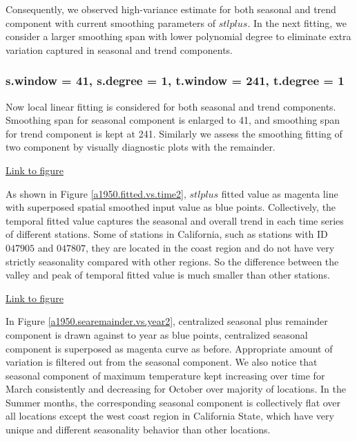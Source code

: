 Consequently, we observed high-variance estimate for both seasonal and trend
component with current smoothing parameters of $stlplus$. In the next fitting, we
consider a larger smoothing span with lower polynomial degree to eliminate extra
variation captured in seasonal and trend components. 

\subsubsection{s.window = 41, s.degree = 1, t.window = 241, t.degree = 1}

Now local linear fitting is considered for both seasonal and trend components. 
Smoothing span for seasonal component is enlarged to 41, and smoothing span for 
trend component is kept at 241. Similarly we assess the smoothing fitting of two
component by visually diagnostic plots with the remainder.

\begin{framed}
\begin{center}
  \href{../plots/a1950/stlplus/t241td1_s41sd1_ffd/a1950.stlraw.vs.time.pdf}
  {Link to figure}
  \label{a1950.fitted.vs.time2}
\end{center}
\end{framed}

As shown in Figure
\href{../plots/a1950/stlplus/t241td1_s41sd1_ffd/a1950.stlraw.vs.time.pdf}
{\ref*{a1950.fitted.vs.time2}}, $stlplus$ fitted value as magenta line with 
superposed spatial smoothed input value as blue points. Collectively, the temporal
fitted value captures the seasonal and overall trend in each time series of 
different stations. Some of stations in California, such as stations with ID 
$047905$ and $047807$, they are located in the coast region and do not have very
strictly seasonality compared with other regions. So the difference between the
valley and peak of temporal fitted value is much smaller than other stations.

\begin{framed}
\begin{center}
  \href{../plots/a1950/stlplus/t241td1_s41sd1_ffd/a1950.searemainder.vs.year.pdf}
  {Link to figure}
  \label{a1950.searemainder.vs.year2}
\end{center}
\end{framed}

In Figure 
\href{../plots/a1950/stlplus/t241td1_s41sd1_ffd/a1950.searemainder.vs.year.pdf}
{\ref*{a1950.searemainder.vs.year2}}, centralized seasonal plus remainder 
component is drawn against to year as blue points, centralized seasonal component
is superposed as magenta curve as before. Appropriate amount of variation is 
filtered out from the seasonal component. We also notice that seasonal component
of maximum temperature kept increasing over time for March consistently and 
decreasing for October over majority of locations. In the Summer months, the 
corresponding seasonal component is collectively flat over all locations except 
the west coast region in California State, which have very unique and different
seasonality behavior than other locations.



